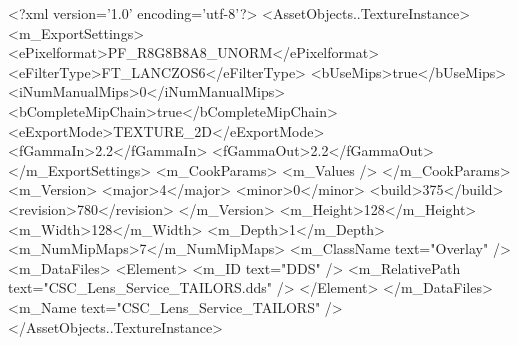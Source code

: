 <?xml version='1.0' encoding='utf-8'?>
<AssetObjects..TextureInstance>
  <m_ExportSettings>
    <ePixelformat>PF_R8G8B8A8_UNORM</ePixelformat>
    <eFilterType>FT_LANCZOS6</eFilterType>
    <bUseMips>true</bUseMips>
    <iNumManualMips>0</iNumManualMips>
    <bCompleteMipChain>true</bCompleteMipChain>
    <eExportMode>TEXTURE_2D</eExportMode>
    <fGammaIn>2.2</fGammaIn>
    <fGammaOut>2.2</fGammaOut>
  </m_ExportSettings>
  <m_CookParams>
    <m_Values />
  </m_CookParams>
  <m_Version>
    <major>4</major>
    <minor>0</minor>
    <build>375</build>
    <revision>780</revision>
  </m_Version>
  <m_Height>128</m_Height>
  <m_Width>128</m_Width>
  <m_Depth>1</m_Depth>
  <m_NumMipMaps>7</m_NumMipMaps>
  <m_ClassName text="Overlay" />
  <m_DataFiles>
    <Element>
      <m_ID text="DDS" />
      <m_RelativePath text="CSC_Lens_Service_TAILORS.dds" />
    </Element>
  </m_DataFiles>
  <m_Name text="CSC_Lens_Service_TAILORS" />
</AssetObjects..TextureInstance>
